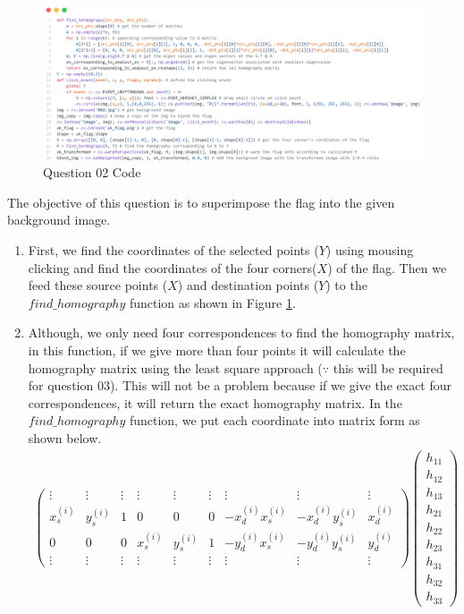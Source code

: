 \documentclass[a4paper]{article}
\begin{document}
\begin{figure}[!htb]
  \centering
  \includegraphics[width=\textwidth]{images/q2code.png}
  \caption{Question 02 Code}
  \label{q2code}
\end{figure}
The objective of this question is to superimpose the flag into the given background image.
\begin{enumerate}
  \item First, we find the coordinates of the selected points ($Y$) using
   mousing clicking and find the coordinates of the four corners($X$) of
    the flag. Then we feed these source points ($X$) and destination points
     ($Y$) to the $find\_homography$ function as shown in Figure \ref{q2code}.
  \item Although, we only need four correspondences to find the
   homography matrix, in this function, if we give more than four
    points it will calculate the homography matrix using the least
     square approach  ($\because$ this will be required for question 03). This
      will not be a problem because if we give the exact four
       correspondences, it will return the exact homography matrix.
        In the $find\_homography$ function,
   we put each coordinate into matrix form as shown below.
   \begin{align*}
     \begin{pmatrix}
       \vdots & \vdots & \vdots & \vdots & \vdots & \vdots & \vdots & \vdots & \vdots\\
       x_s^{(i)} & y_s^{(i)} & 1 & 0 & 0 & 0 &-x_d^{(i)}x_s^{(i)} &-x_d^{(i)}y_s^{(i)} & x_d^{(i)}\\
       0 & 0 & 0 & x_s^{(i)} & y_s^{(i)} & 1 & -y_d^{(i)}x_s^{(i)} &-y_d^{(i)}y_s^{(i)} & y_d^{(i)}\\
       \vdots & \vdots & \vdots & \vdots & \vdots & \vdots & \vdots & \vdots & \vdots
     \end{pmatrix}
     \begin{pmatrix}
       h_{11} \\ h_{12} \\h_{13} \\ h_{21} \\ h_{22} \\ h_{23} \\ h_{31} \\ h_{32} \\ h_{33}

\end{pmatrix}
\end{align*}
\end{enumerate}
\end{document}
